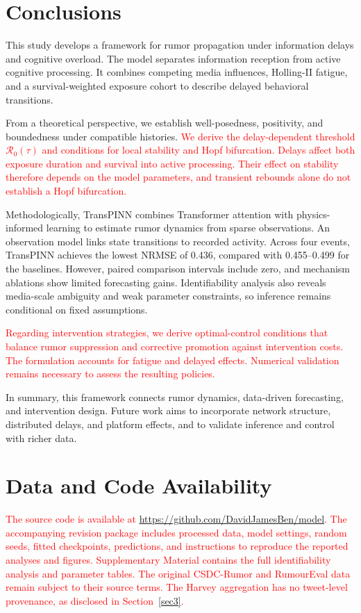 \documentclass[letterpaper,journal]{IEEEtran}
\begin{document}
	\section{Conclusions}
	\label{sec5}
	
	This study develops a framework for rumor propagation under information delays and cognitive overload. The model separates information reception from active cognitive processing. It combines competing media influences, Holling-II fatigue, and a survival-weighted exposure cohort to describe delayed behavioral transitions.

	From a theoretical perspective, we establish well-posedness, positivity, and boundedness under compatible histories. 
	\textcolor{red}{We derive the delay-dependent threshold $\mathcal R_0(\tau)$ and conditions for local stability and Hopf bifurcation. Delays affect both exposure duration and survival into active processing.} 
	\textcolor{red}{Their effect on stability therefore depends on the model parameters, and transient rebounds alone do not establish a Hopf bifurcation.}

	Methodologically, TransPINN combines Transformer attention with physics-informed learning to estimate rumor dynamics from sparse observations. An observation model links state transitions to recorded activity. Across four events, TransPINN achieves the lowest NRMSE of 0.436, compared with 0.455--0.499 for the baselines. However, paired comparison intervals include zero, and mechanism ablations show limited forecasting gains. Identifiability analysis also reveals media-scale ambiguity and weak parameter constraints, so inference remains conditional on fixed assumptions.

	\textcolor{red}{Regarding intervention strategies, we derive optimal-control conditions that balance rumor suppression and corrective promotion against intervention costs. The formulation accounts for fatigue and delayed effects. Numerical validation remains necessary to assess the resulting policies.}

	In summary, this framework connects rumor dynamics, data-driven forecasting, and intervention design. Future work aims to incorporate network structure, distributed delays, and platform effects, and to validate inference and control with richer data.

	\section*{Data and Code Availability}
	\textcolor{red}{The source code is available at \url{https://github.com/DavidJamesBen/model}. The accompanying revision package includes processed data, model settings, random seeds, fitted checkpoints, predictions, and instructions to reproduce the reported analyses and figures. Supplementary Material contains the full identifiability analysis and parameter tables. The original CSDC-Rumor and RumourEval data remain subject to their source terms. The Harvey aggregation has no tweet-level provenance, as disclosed in Section~\ref{sec3}.}
\end{document}
